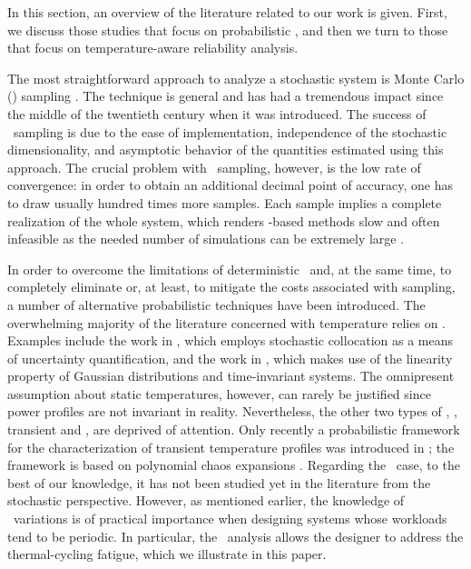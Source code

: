 In this section, an overview of the literature related to our work is given.
First, we discuss those studies that focus on probabilistic \ta, and then we turn to those that focus on temperature-aware reliability analysis.

The most straightforward approach to analyze a stochastic system is Monte Carlo (\MC) sampling \cite{maitre2010}.
The technique is general and has had a tremendous impact since the middle of the twentieth century when it was introduced.
The success of \MC\ sampling is due to the ease of implementation, independence of the stochastic dimensionality, and asymptotic behavior of the quantities estimated using this approach.
The crucial problem with \MC\ sampling, however, is the low rate of convergence: in order to obtain an additional decimal point of accuracy, one has to draw usually hundred times more samples.
Each sample implies a complete realization of the whole system, which renders \MC-based methods slow and often infeasible as the needed number of simulations can be extremely large \cite{diaz-emparanza2002}.

In order to overcome the limitations of deterministic \ta\ and, at the same time, to completely eliminate or, at least, to mitigate the costs associated with  sampling, a number of alternative probabilistic techniques have been introduced.
The overwhelming majority of the literature concerned with temperature relies on \sssta.
Examples include the work in \cite{lee2013}, which employs stochastic collocation \cite{maitre2010} as a means of uncertainty quantification, and the work in \cite{juan2012}, which makes use of the linearity property of Gaussian distributions and time-invariant systems.
The omnipresent assumption about static temperatures, however, can rarely be justified since power profiles are not invariant in reality.
Nevertheless, the other two types of \ta, \ie, transient and \DSS, are deprived of attention.
Only recently a probabilistic framework for the characterization of transient temperature profiles was introduced in \cite{ukhov2014}; the framework is based on polynomial chaos expansions \cite{maitre2010}.
Regarding the \DSS\ case, to the best of our knowledge, it has not been studied yet in the literature from the stochastic perspective.
However, as mentioned earlier, the knowledge of \DSS\ variations is of practical importance when designing systems whose workloads tend to be periodic.
In particular, the \DSS\ analysis allows the designer to address the thermal-cycling fatigue, which we illustrate in this paper.

